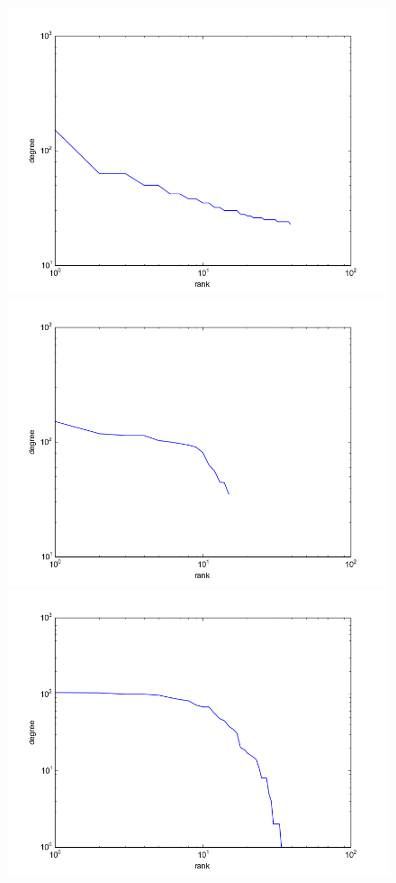 \documentclass[12pt]{article}
\begin{document}
\begin{figure}\label{fig:stack_ts_degree}
  \begin{center}
    \includegraphics[scale=0.4]{degrees_sinusoid}
    \includegraphics[scale=0.4]{degrees_logit}
    \includegraphics[scale=0.4]{degrees_fbm}

\end{center}
\end{figure}
\end{document}
